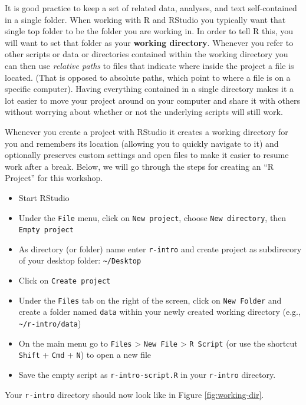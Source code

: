 \documentclass[
]{book}
\providecommand{\tightlist}{%
  \setlength{\itemsep}{0pt}\setlength{\parskip}{0pt}}
\begin{document}
It is good practice to keep a set of related data, analyses, and text
self-contained in a single folder. When working with R and RStudio you typically want that single top folder to be the folder you are working in. In order to tell R this, you will want to set that folder as your \textbf{working directory}. Whenever you refer to other scripts or data or directories contained within the working directory you can then use \emph{relative paths} to files that indicate
where inside the project a file is located. (That is opposed to absolute paths, which
point to where a file is on a specific computer). Having everything contained in a single directory makes it
a lot easier to move your project around on your computer and share it with
others without worrying about whether or not the underlying scripts will still
work.

Whenever you create a project with RStudio it creates a working directory for you and remembers
its location (allowing you to quickly navigate to it) and optionally preserves
custom settings and open files to make it easier to resume work after a
break. Below, we will go through the steps for creating an ``R Project'' for this
workshop.

\begin{itemize}
\tightlist
\item
  Start RStudio
\item
  Under the \texttt{File} menu, click on \texttt{New\ project}, choose \texttt{New\ directory}, then
  \texttt{Empty\ project}
\item
  As directory (or folder) name enter \texttt{r-intro} and create project as subdirecory of your desktop folder: \texttt{\textasciitilde{}/Desktop}
\item
  Click on \texttt{Create\ project}
\item
  Under the \texttt{Files} tab on the right of the screen, click on \texttt{New\ Folder} and
  create a folder named \texttt{data} within your newly created working directory (e.g., \texttt{\textasciitilde{}/r-intro/data})
\item
  On the main menu go to \texttt{Files} \textgreater{} \texttt{New\ File} \textgreater{} \texttt{R\ Script} (or use the shortcut \texttt{Shift} + \texttt{Cmd} + \texttt{N}) to open a new file
\item
  Save the empty script as \texttt{r-intro-script.R} in your \texttt{r-intro} directory.
\end{itemize}

Your \texttt{r-intro} directory should now look like in Figure \ref{fig:working-dir}.
\end{document}
